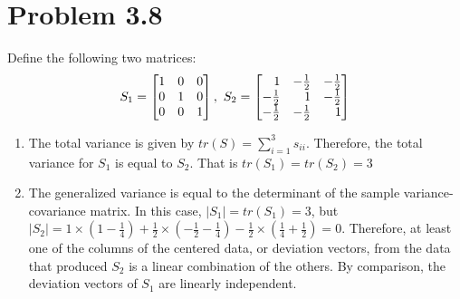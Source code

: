 


\maketitle	

\section*{Problem 3.8}
Define the following two matrices: 
$$
S_1 = \m{1 & 0 & 0 \\ 0 & 1 & 0 \\ 0 & 0 & 1},\ 
S_2 = \m{1 & -\frac{1}{2} & -\frac{1}{2} \\ -\frac{1}{2} & 1 & -\frac{1}{2} \\ -\frac{1}{2} & -\frac{1}{2} & 1} 
$$
\renewcommand{\labelenumi}{\alph{enumi})}
\begin{enumerate}
	\item The total variance is given by $tr(S)=\sum_{i=1}^{3}s_{ii}$. Therefore, the total variance for $S_1$ is equal to $S_2$. That is $tr(S_1) = tr(S_2) = 3$

	\item The generalized variance is equal to the determinant of the sample variance-covariance matrix. In this case, $|S_1| = tr(S_1) = 3$, but $|S_2| = 1 \times (1-\frac{1}{4}) + \frac{1}{2} \times (-\frac{1}{2} - \frac{1}{4}) - \frac{1}{2} \times (\frac{1}{4} + \frac{1}{2}) = 0$. Therefore, at least one of the columns of the centered data, or deviation vectors, from the data that produced $S_2$ is a linear combination of the others. By comparison, the deviation vectors of $S_1$ are linearly independent.
\end{enumerate}

\newpage
